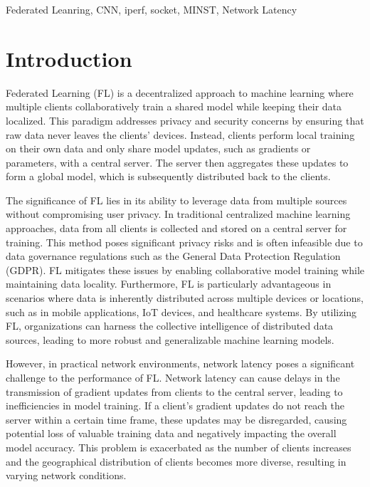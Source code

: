 \documentclass[conference]{IEEEtran}
\begin{document}
\begin{IEEEkeywords}
Federated Leanring, CNN, iperf, socket, MINST, Network Latency
\end{IEEEkeywords}

\section{Introduction}
Federated Learning (FL) is a decentralized approach to machine learning where multiple clients collaboratively train a shared model while keeping their data localized. This paradigm addresses privacy and security concerns by ensuring that raw data never leaves the clients' devices. Instead, clients perform local training on their own data and only share model updates, such as gradients or parameters, with a central server. The server then aggregates these updates to form a global model, which is subsequently distributed back to the clients.

The significance of FL lies in its ability to leverage data from multiple sources without compromising user privacy. In traditional centralized machine learning approaches, data from all clients is collected and stored on a central server for training. This method poses significant privacy risks and is often infeasible due to data governance regulations such as the General Data Protection Regulation (GDPR). FL mitigates these issues by enabling collaborative model training while maintaining data locality. Furthermore, FL is particularly advantageous in scenarios where data is inherently distributed across multiple devices or locations, such as in mobile applications, IoT devices, and healthcare systems. By utilizing FL, organizations can harness the collective intelligence of distributed data sources, leading to more robust and generalizable machine learning models.

However, in practical network environments, network latency poses a significant challenge to the performance of FL. Network latency can cause delays in the transmission of gradient updates from clients to the central server, leading to inefficiencies in model training. If a client's gradient updates do not reach the server within a certain time frame, these updates may be disregarded, causing potential loss of valuable training data and negatively impacting the overall model accuracy. This problem is exacerbated as the number of clients increases and the geographical distribution of clients becomes more diverse, resulting in varying network conditions.
\end{document}
